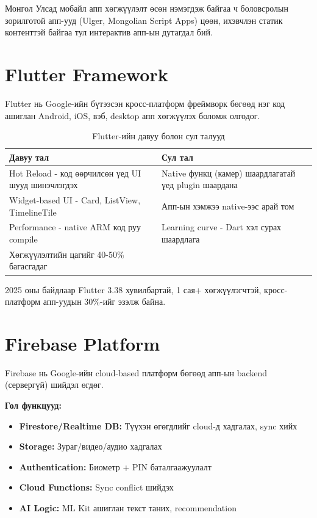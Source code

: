 Монгол Улсад мобайл апп хөгжүүлэлт өсөн нэмэгдэж байгаа ч боловсролын зорилготой апп-ууд (Ulger, Mongolian Script Apps) цөөн, ихэвчлэн статик контенттэй байгаа тул интерактив апп-ын дутагдал бий.

\section{Flutter Framework}

Flutter нь Google-ийн бүтээсэн кросс-платформ фреймворк бөгөөд нэг код ашиглан Android, iOS, вэб, desktop апп хөгжүүлэх боломж олгодог.

\begin{table}[h]
\centering
\begin{tabular}{|p{6cm}|p{7cm}|}
\hline
\textbf{Давуу тал} & \textbf{Сул тал} \\
\hline
Hot Reload - код өөрчилсөн үед UI шууд шинэчлэгдэх & Native функц (камер) шаардлагатай үед plugin шаардана \\
\hline
Widget-based UI - Card, ListView, TimelineTile & Апп-ын хэмжээ native-ээс арай том \\
\hline
Performance - native ARM код руу compile & Learning curve - Dart хэл сурах шаардлага \\
\hline
Хөгжүүлэлтийн цагийг 40-50\% багасгадаг & \\
\hline
\end{tabular}
\caption{Flutter-ийн давуу болон сул талууд}
\label{tab:flutter}
\end{table}

2025 оны байдлаар Flutter 3.38 хувилбартай, 1 сая+ хөгжүүлэгчтэй, кросс-платформ апп-уудын 30\%-ийг эзэлж байна.

\section{Firebase Platform}

Firebase нь Google-ийн cloud-based платформ бөгөөд апп-ын backend (сервергүй) шийдэл өгдөг.

\textbf{Гол функцууд:}
\begin{itemize}
	\item \textbf{Firestore/Realtime DB:} Түүхэн өгөгдлийг cloud-д хадгалах, sync хийх
	\item \textbf{Storage:} Зураг/видео/аудио хадгалах
	\item \textbf{Authentication:} Биометр + PIN баталгаажуулалт
	\item \textbf{Cloud Functions:} Sync conflict шийдэх
	\item \textbf{AI Logic:} ML Kit ашиглан текст таних, recommendation
\end{itemize}

